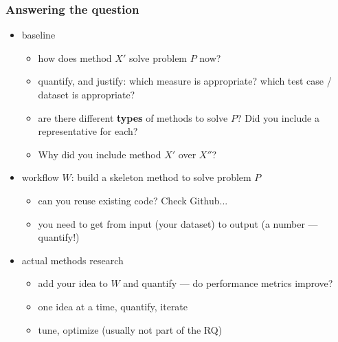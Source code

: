 \documentclass{beamer}
\begin{document}
\begin{frame}
  \frametitle{Answering the question}
  \begin{itemize}
  \item baseline
    \begin{itemize}
    \item how does method $X'$ solve problem $P$ now?
    \item quantify, and justify: which measure is appropriate? which
      test case / dataset is appropriate?
    \item are there different {\bf types} of methods to solve $P$? Did
      you include a representative for each?
    \item Why did you include method $X'$ over $X''$?
    \end{itemize}
    \pause
  \item workflow $W$: build a skeleton method to solve problem $P$
    \begin{itemize}
    \item can you reuse existing code? Check Github...
    \item you need to get from input (your dataset) to output (a
      number --- quantify!)
    \end{itemize}
    \pause
  \item actual methods research
    \begin{itemize}
    \item add your idea to $W$ and quantify --- do performance metrics
      improve?
    \item one idea at a time, quantify, iterate
    \item tune, optimize (usually not part of the RQ)
    \end{itemize}
  \end{itemize}
\end{frame}
\end{document}
